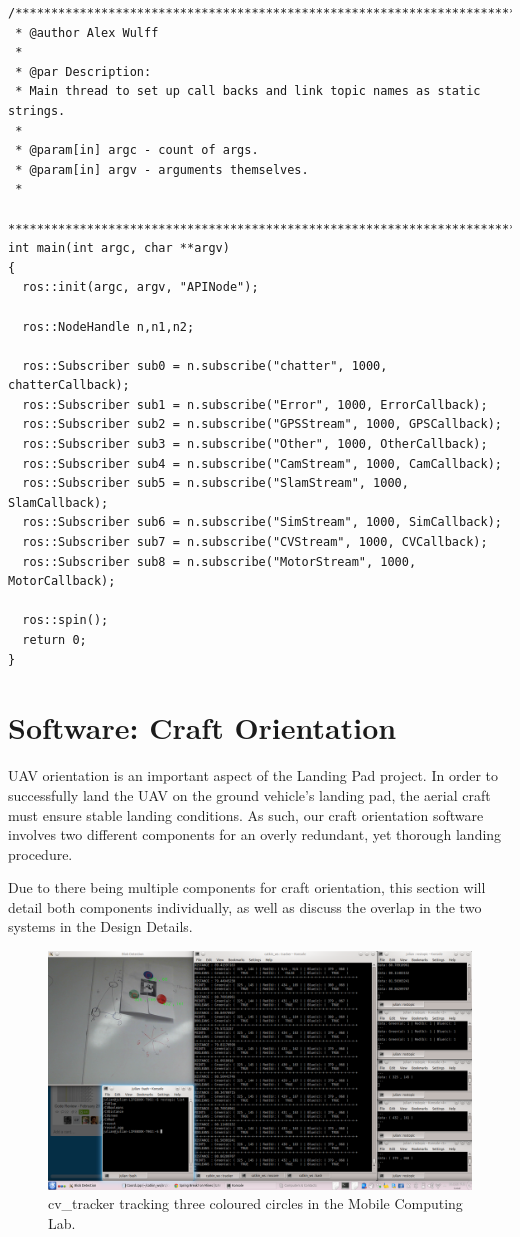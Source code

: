 \begin{lstlisting}
/******************************************************************************
 * @author Alex Wulff
 *
 * @par Description:
 * Main thread to set up call backs and link topic names as static strings.
 *
 * @param[in] argc - count of args.
 * @param[in] argv - arguments themselves.
 *
 *****************************************************************************/
int main(int argc, char **argv)
{
  ros::init(argc, argv, "APINode");

  ros::NodeHandle n,n1,n2;

  ros::Subscriber sub0 = n.subscribe("chatter", 1000, chatterCallback);
  ros::Subscriber sub1 = n.subscribe("Error", 1000, ErrorCallback);
  ros::Subscriber sub2 = n.subscribe("GPSStream", 1000, GPSCallback);
  ros::Subscriber sub3 = n.subscribe("Other", 1000, OtherCallback);
  ros::Subscriber sub4 = n.subscribe("CamStream", 1000, CamCallback);
  ros::Subscriber sub5 = n.subscribe("SlamStream", 1000, SlamCallback);
  ros::Subscriber sub6 = n.subscribe("SimStream", 1000, SimCallback);
  ros::Subscriber sub7 = n.subscribe("CVStream", 1000, CVCallback);
  ros::Subscriber sub8 = n.subscribe("MotorStream", 1000, MotorCallback);

  ros::spin();
  return 0;
}
\end{lstlisting}


\section{Software: Craft Orientation}\label{softwarecraftorientation}
UAV orientation is an important aspect of the Landing Pad project. In order to successfully land the UAV on the ground vehicle's landing pad, the aerial craft must ensure stable landing conditions. As such, our craft orientation software involves two different components for an overly redundant, yet thorough landing procedure.

Due to there being multiple components for craft orientation, this section will detail both components individually, as well as discuss the overlap in the two systems in the Design Details.


\begin{figure}[tbh]
	\begin{center}
	\includegraphics[width=1\textwidth]{resources/img/cv_tracker}
	\end{center}
	\caption{cv\_tracker tracking three coloured circles in the Mobile Computing Lab. \label{cvtracker}}
\end{figure}


